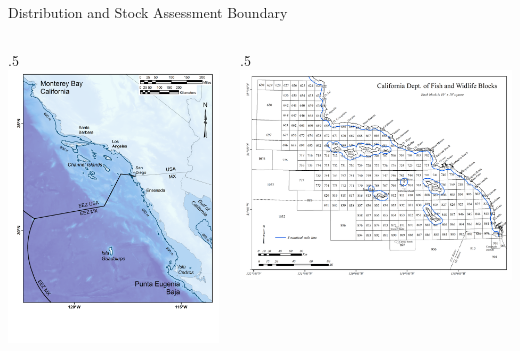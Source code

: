 \documentclass[ignorenonframetext,]{beamer}
\def\begincols{\begin{columns}}
\def\begincol{\begin{column}}
\def\endcol{\end{column}}
\def\endcols{\end{columns}}
\begin{document}
\begin{frame}{Distribution and Stock Assessment Boundary}

\begincols
 \begincol{.5\textwidth} \includegraphics{Figures/Distribution_map.png}
\endcol
 \begincol{.5\textwidth} \includegraphics{Figures/assess_region_map.png}
\endcol
\endcols

\end{frame}
\end{document}
